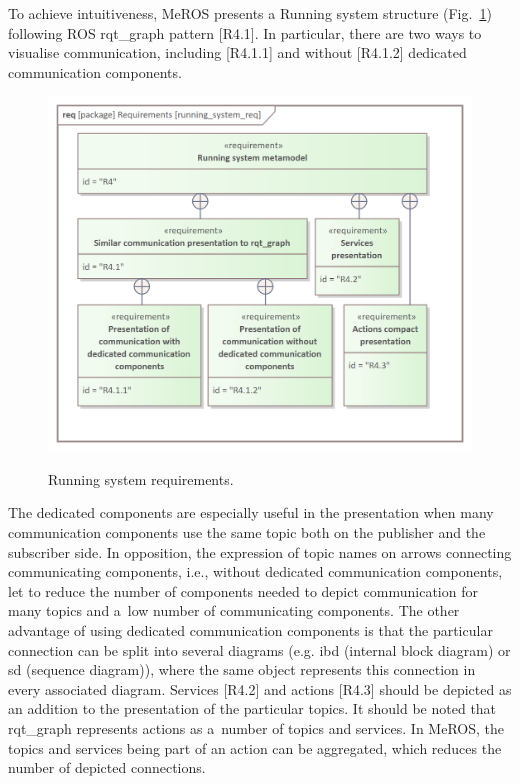 \documentclass{ieeeaccess}
\begin{document}


	
	
	To achieve intuitiveness, MeROS presents a Running system structure (Fig.~\ref{fig:running_system_req}) following ROS rqt\_graph pattern [R4.1]. In particular, there are two ways to visualise communication, including [R4.1.1] and without [R4.1.2]
	dedicated communication components.
	\begin{figure}[htb]
		\centering
		\begin{center}
			{\includegraphics[scale=0.69]{img/requirement_pkg/running_system_req.png}}
		\end{center}
		\caption{Running system requirements.} 
		\label{fig:running_system_req}
	\end{figure}
	 The dedicated components are especially useful in the presentation when many communication components use the same topic both on the publisher and the subscriber side. In opposition, the expression of topic names on arrows connecting communicating components, i.e., without dedicated communication components, let to reduce the number of components needed to depict communication for many topics and a~low number of communicating components. The other advantage of using dedicated communication components is that the particular connection can be split into several diagrams (e.g. ibd (internal block diagram) or sd (sequence diagram)), where the same object represents this connection in every associated diagram. Services [R4.2] and actions [R4.3] should be depicted as an addition to the presentation of the particular topics. It should be noted that rqt\_graph represents actions as a~number of topics and services. In MeROS, the topics and services being part of an action can be aggregated, which reduces the number of depicted connections.
		
\end{document}
